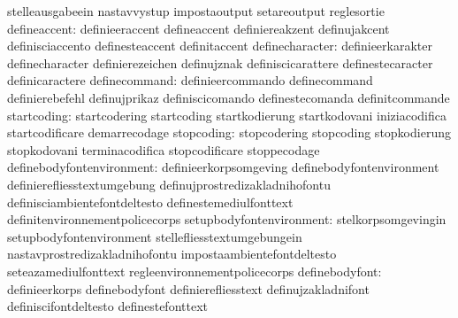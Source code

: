                                   stelleausgabeein                 nastavvystup
                                  impostaoutput                    setareoutput
                                  reglesortie
                    defineaccent: definieeraccent                  defineaccent
                                  definiereakzent                  definujakcent
                                  definisciaccento                 definesteaccent
                                  definitaccent
                 definecharacter: definieerkarakter                definecharacter
                                  definierezeichen                 definujznak
                                  definiscicarattere               definestecaracter
                                  definicaractere
                   definecommand: definieercommando                definecommand
                                  definierebefehl                  definujprikaz
                                  definiscicomando                 definestecomanda
                                  definitcommande
                     startcoding: startcodering                    startcoding
                                  startkodierung                   startkodovani
                                  iniziacodifica                   startcodificare
                                  demarrecodage
                      stopcoding: stopcodering                     stopcoding
                                  stopkodierung                    stopkodovani
                                  terminacodifica                  stopcodificare
                                  stoppecodage
       definebodyfontenvironment: definieerkorpsomgeving           definebodyfontenvironment
                                  definierefliesstextumgebung      definujprostredizakladnihofontu
                                  definisciambientefontdeltesto    definestemediulfonttext
                                  definitenvironnementpolicecorps
        setupbodyfontenvironment: stelkorpsomgevingin              setupbodyfontenvironment
                                  stellefliesstextumgebungein      nastavprostredizakladnihofontu
                                  impostaambientefontdeltesto      seteazamediulfonttext
                                  regleenvironnementpolicecorps
                  definebodyfont: definieerkorps                   definebodyfont
                                  definierefliesstext              definujzakladnifont
                                  definiscifontdeltesto            definestefonttext
